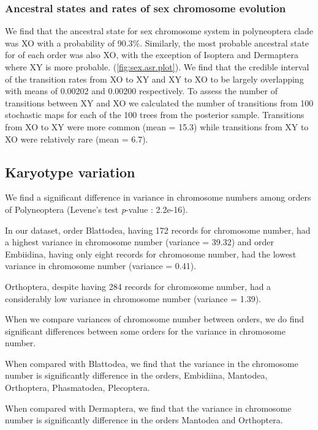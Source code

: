 

\subsubsection{Ancestral states and rates of sex chromosome evolution}

We find that the ancestral state for sex chromosome system in polyneoptera clade was XO with a probability of 90.3\%.
Similarly, the most probable ancestral state for of each order was also XO, with the exception of Isoptera and Dermaptera where XY is more probable.
(\cref{fig:sex.asr.plot}).
We find that the credible interval of the transition rates from XO to XY and XY to XO to be largely overlapping with means of 0.00202 and 0.00200 respectively. 
To assess the number of transitions between XY and XO we calculated the number of transitions from 100 stochastic maps for each of the 100 trees from the posterior sample.
Transitions from XO to XY were more common (mean = 15.3) while transitions from XY to XO were relatively rare (mean = 6.7).

\subsection{Karyotype variation}
We find a significant difference in variance in chromosome numbers among orders of Polyneoptera (Levene's test \textit{p}-value : 2.2e-16). %

In our dataset, order Blattodea, having 172 records for chromosome number, had a highest variance in chromosome number (variance = 39.32) and order Embiidina, having only eight records for chromosome number, had the lowest variance in chromosome number (variance = 0.41).

Orthoptera, despite having 284 records for chromosome number, had a considerably low variance in chromosome number (variance = 1.39). 

When we compare variances of chromosome number between orders, we do find significant differences between some orders for the variance in chromosome number. 

When compared with Blattodea, we find that the variance in the chromosome number is significantly difference in the orders, Embidiina, Mantodea, Orthoptera, Phasmatodea, Plecoptera. 

When compared with Dermaptera, we find that the variance in chromosome number is significantly difference in the orders Mantodea and Orthoptera. 

